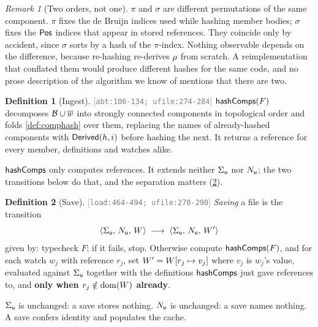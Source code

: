 \documentclass[11pt]{article}
\theoremstyle{definition}
\newtheorem{definition}{Definition}[section]
\theoremstyle{plain}
\theoremstyle{remark}
\newtheorem{remark}{Remark}[section]
\newcommand{\src}[1]{{\footnotesize\textcolor{gray}{[\texttt{#1}]}}}
\begin{document}
\begin{remark}[Two orders, not one]\label{rem:twoorders}
$\pi$ and $\sigma$ are different permutations of the same component. $\pi$ fixes the de Bruijn
indices used while hashing member bodies; $\sigma$ fixes the $\mathsf{Pos}$ indices that appear in stored
references. They coincide only by accident, since $\sigma$ sorts by a hash of the $\pi$-index.
Nothing observable depends on the difference, because re-hashing re-derives $\rho$ from scratch. A
reimplementation that conflated them would produce different hashes for the same code, and no prose
description of the algorithm we know of mentions that there are two.
\end{remark}

\begin{definition}[Ingest]\label{def:uingest}
\src{abt:106-134; ufile:274-284} $\mathsf{hashComps}(F)$ decomposes $\mathcal{B} \cup \overline{w}$ into strongly
connected components in topological order and folds \cref{def:comphash} over them, replacing the
names of already-hashed components with $\mathsf{Derived}(h,i)$ before hashing the next. It returns a reference
for every member, definitions and watches alike.

$\mathsf{hashComps}$ only computes references. It extends neither $\Sigma_{\mathsf{u}}$ nor $N_{\mathsf{u}}$; the two
transitions below do that, and the separation matters (\cref{def:usave}).
\end{definition}

\begin{definition}[Save]\label{def:usave}
\src{load:464-494; ufile:270-290} \emph{Saving} a file is the transition
\[
  \langle \Sigma_{\mathsf{u}},\, N_{\mathsf{u}},\, W\rangle
  \;\longrightarrow\;
  \langle \Sigma_{\mathsf{u}},\, N_{\mathsf{u}},\, W'\rangle
\]
given by: typecheck $F$; if it fails, stop. Otherwise compute $\mathsf{hashComps}(F)$, and for each watch
$w_j$ with reference $r_j$, set $W' = W[r_j \mapsto v_j]$ where $v_j$ is $w_j$'s value,
evaluated against $\Sigma_{\mathsf{u}}$ together with the definitions $\mathsf{hashComps}$ just gave references to, and
\textbf{only when $r_j \notin \operatorname{dom}(W)$ already}.

$\Sigma_{\mathsf{u}}$ is unchanged: a save stores nothing. $N_{\mathsf{u}}$ is unchanged: a save names nothing. A save
confers identity and populates the cache.
\end{definition}
\end{document}
